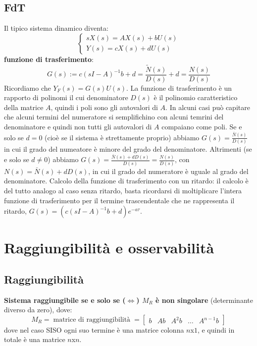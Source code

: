     \subsection{FdT}
    Il tipico sistema dinamico diventa:
    \[
        \begin{cases}
            s X(s) = AX(s) + b U(s)\\
            Y(s) = cX(s) + d U(s)
        \end{cases}
    \]
    \textbf{funzione di trasferimento}:
    \[
        G(s) := c(sI-A)^{-1} b + d = \frac{\tilde{N}(s)}{D(s)} + d = \frac{N(s)}{D(s)}
    \]
    Ricordiamo che $Y_F(s) = G(s) U(s)$.\newline
    \newline
    La funzione di trasferimento è un rapporto di polinomi il cui denominatore $D(s)$ è il polinomio caratteristico della matrice $A$, quindi i poli sono gli autovalori di $A$. In alcuni casi può capitare che alcuni termini del numeratore si semplifichino con alcuni temrini del denominatore e quindi non tutti gli autovalori di $A$ compaiano come poli.\newline
    Se e solo se $d=0$ (cioè se il sistema è strettamente proprio) abbiamo $G(s) = \frac{\bar{N}(s)}{D(s)}$ in cui il grado del numeatore è minore del grado del denominatore.\newline
    Altrimenti (se e solo se $d\neq 0$) abbiamo $G(s) = \frac{\bar{N}(s) + dD(s)}{D(s)} = \frac{N(s)}{D(s)}$, con $N(s) = \bar{N}(s) +dD(s)$, in cui il grado del numeratore è uguale al grado del denominatore.\newline
    \newline
    Calcolo della funzione di trasferimento con un ritardo: il calcolo è del tutto analogo al caso senza ritardo, basta ricordarsi di moltiplicare l'intera funzione di trasferimento per il termine trascendentale che ne rappresenta il ritardo, $G(s) = (c(sI-A)^{-1} b + d) e^{-a \tau}$.
    \newpage\section{Raggiungibilità e osservabilità}
    \subsection{Raggiungibilità}
    \textbf{Sistema raggiungibile se e solo se ($\Leftrightarrow$) $M_R$ è non singolare} (determinante diverso da zero), dove:
    \[
        M_R= \;\text{matrice di raggiungibilità}\; =\left[\begin{matrix}
            b & Ab & A^2 b & \dots & A^{n-1}b
        \end{matrix}\right]
    \] 
    dove nel caso SISO ogni suo termine è una matrice colonna $n$x$1$, e quindi in totale è una matrice $n$x$n$.
